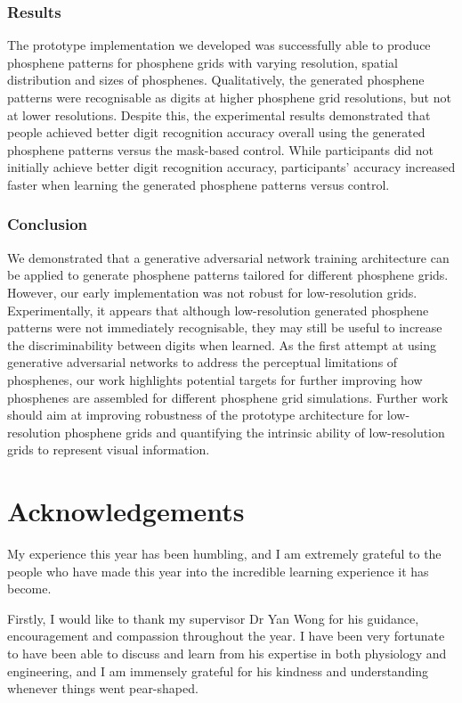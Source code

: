 \documentclass[a4paper,11pt,openany]{book}
\begin{document}
\subsubsection*{Results}
The prototype implementation we developed was successfully able to produce phosphene patterns for phosphene grids with varying resolution, spatial distribution and sizes of phosphenes.
Qualitatively, the generated phosphene patterns were recognisable as digits at higher phosphene grid resolutions, but not at lower resolutions.
Despite this, the experimental results demonstrated that people achieved better digit recognition accuracy overall using the generated phosphene patterns versus the mask-based control.
While participants did not initially achieve better digit recognition accuracy, participants' accuracy increased faster when learning the generated phosphene patterns versus control.

\subsubsection*{Conclusion}
We demonstrated that a generative adversarial network training architecture can be applied to generate phosphene patterns tailored for different phosphene grids.
However, our early implementation was not robust for low-resolution grids.
Experimentally, it appears that although low-resolution generated phosphene patterns were not immediately recognisable, they may still be useful to increase the discriminability between digits when learned.
As the first attempt at using generative adversarial networks to address the perceptual limitations of phosphenes, our work highlights potential targets for further improving how phosphenes are assembled for different phosphene grid simulations.
Further work should aim at improving robustness of the prototype architecture for low-resolution phosphene grids and quantifying the intrinsic ability of low-resolution grids to represent visual information.

\clearpage

\section*{Acknowledgements}

My experience this year has been humbling, and I am extremely grateful to the people who have made this year into the incredible learning experience it has become.

Firstly, I would like to thank my supervisor Dr Yan Wong for his guidance, encouragement and compassion throughout the year.
I have been very fortunate to have been able to discuss and learn from his expertise in both physiology and engineering, and I am immensely grateful for his kindness and understanding whenever things went pear-shaped.
\end{document}
